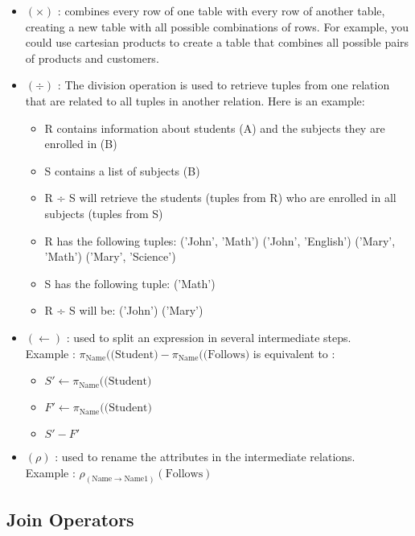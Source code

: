 \begin{itemize}
    \item {} $(\times)$ : combines every row of one table with every row of another table, creating a new table with all possible combinations of rows. For example, you could use cartesian products to create a table that combines all possible pairs of products and customers.
    \item {} $(\div)$ : The division operation is used to retrieve tuples from one relation that are related to all tuples in another relation. Here is an example:
        \begin{itemize}
            \item R contains information about students (A) and the subjects they are enrolled in (B)
            \item S contains a list of subjects (B)
            \item R ÷ S will retrieve the students (tuples from R) who are enrolled in all subjects (tuples from S)
            \item R has the following tuples: ('John', 'Math') ('John', 'English') ('Mary', 'Math') ('Mary', 'Science')
            \item S has the following tuple: ('Math')
            \item R ÷ S will be: ('John') ('Mary')
        \end{itemize}
    \item {} $(\leftarrow)$ : used to split an expression in several intermediate steps.\\Example : $\pi_{\text{Name}}(\text{(Student)} - \pi_{\text{Name}}(\text{(Follows)}$ is equivalent to :
        \begin{itemize}
            \item $S' \leftarrow \pi_{\text{Name}}(\text{(Student)}$
            \item $F' \leftarrow \pi_{\text{Name}}(\text{(Student)}$
            \item $S' - F'$
        \end{itemize}
    \item {} $(\rho)$ : used to rename the attributes in the intermediate relations.\\Example : $\rho_{(\text{Name} \rightarrow \text{Name1})}(\text{Follows})$
\end{itemize}

\subsection{Join Operators}

